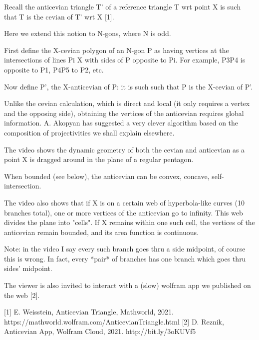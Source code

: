 Recall the anticevian triangle T' of a reference triangle T wrt point X is such that T is the cevian of T' wrt X [1]. 

Here we extend this notion to N-gons, where N is odd.

First define the X-cevian polygon of an N-gon P as having vertices at the intersections of lines Pi X with sides of P opposite to Pi. For example, P3P4 is opposite to P1, P4P5 to P2, etc.

Now define P', the X-anticevian of P: it is such such that P is the X-cevian of P'. 

Unlike the cevian calculation, which is direct and local (it only requires a vertex and the opposing side), obtaining the vertices of the anticevian requires global information. A. Akopyan has suggested a very clever algorithm based on the composition of projectivities we shall explain elsewhere.

The video shows  the dynamic geometry of both the cevian and anticevian as a point X is dragged around in the plane of a regular pentagon.

When bounded (see below), the anticevian can be convex, concave, self-intersection.

The video also shows that if X is on a certain web of hyperbola-like curves (10 branches total), one or more vertices of the anticevian go to infinity. This web divides the plane into "cells". If X remains within one such cell, the vertices of the anticevian remain bounded, and its area function is continuous.

Note: in the video I say every such branch goes thru a side midpoint, of course this is wrong. In fact, every *pair* of branches has one branch which goes thru sides' midpoint.

The viewer is also invited to interact with a (slow) wolfram app we published on the web [2].

[1] E. Weisstein, Anticevian Triangle, Mathworld, 2021. https://mathworld.wolfram.com/AnticevianTriangle.html
[2] D. Reznik, Anticevian App, Wolfram Cloud, 2021. http://bit.ly/3oKUVf5